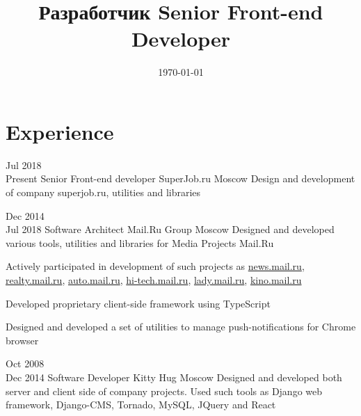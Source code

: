 \documentclass[11pt,a4paper,sans]{moderncv}
\title
    {\lang
        {Разработчик}
        {Senior Front-end Developer}}
\date{\today}
\newcommand{\lang}[2]{#2}
\begin{document}
\makecvtitle

\section
    {\lang
        {Опыт работы}
        {Experience}}

\cventry
    {\lang{Июл}{Jul} 2018\\\lang{по н.в.}{Present}}
    {\lang
        {Фронтенд разработчик}
        {Senior Front-end developer}}
    {SuperJob.ru}
    {\lang
        {Москва}
        {Moscow}}
    {}
    {\lang
        {Разработка и поддержка сайта компании, создание новых инструментов, утилит и библиотек.}
        {Design and development of company superjob.ru, utilities and libraries}}


\cventry
    {\lang{Дек}{Dec} 2014\\\lang{Июл}{Jul} 2018}
    {\lang
        {Архитектор программного обеспечения}
        {Software Architect}}
    {Mail.Ru Group}
    {\lang
        {Москва}
        {Moscow}}
    {}
    {\lang
        {Занимаюсь проектированием и разработкой инструментов, утилит и библиотек в медиапроектах Mail.Ru.}
        {Designed and developed various tools, utilities and libraries for Media Projects Mail.Ru}}


\cvlistitem
    {\lang
        {Принимал участие в разработке проектов \href{https://news.mail.ru}{news.mail.ru}, \href{https://realty.mail.ru}{realty.mail.ru}, \href{https://auto.mail.ru}{auto.mail.ru}, \href{https://hi-tech.mail.ru}{hi-tech.mail.ru}, \href{https://lady.mail.ru}{lady.mail.ru}, \href{https://kino.mail.ru}{kino.mail.ru}}
        {Actively participated in development of such projects as \href{https://news.mail.ru}{news.mail.ru}, \href{https://realty.mail.ru}{realty.mail.ru}, \href{https://auto.mail.ru}{auto.mail.ru}, \href{https://hi-tech.mail.ru}{hi-tech.mail.ru}, \href{https://lady.mail.ru}{lady.mail.ru}, \href{https://kino.mail.ru}{kino.mail.ru}}}

\cvlistitem
    {\lang
        {Разработал фреймворк для создания клиентских приложений с использованием языка TypeScript}
        {Developed proprietary client-side framework using TypeScript}}

\cvlistitem
    {\lang
        {TODO}
        {Designed and developed a set of utilities to manage push-notifications for Chrome browser}}

        

\cventry
    {\lang{Окт}{Oct} 2008\\\lang{Дек}{Dec} 2014}
    {\lang
        {Программист}
        {Software Developer}}
    {Kitty Hug}
    {\lang
        {Москва}
        {Moscow}}
    {}
    {\lang
        {Занимался разработкой и проектированием как серверной, так и клиентской части проектов компании. Использовал Django, Django-CMS, Tornado, MySQL, JQuery и React, занимался написанием юнит-тестов.}
        {Designed and developed both server and client side of company projects. Used such tools as Django web framework, Django-CMS, Tornado, MySQL, JQuery and React}}
\end{document}
